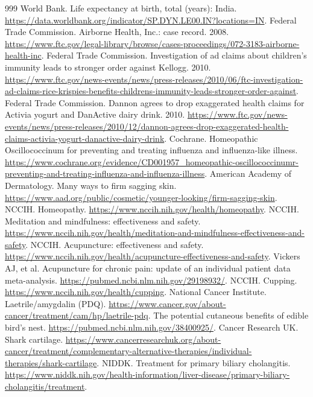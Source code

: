 \documentclass[11pt,oneside]{book}
\begin{document}
\begin{thebibliography}{999}
World Bank. Life expectancy at birth, total (years): India. \url{https://data.worldbank.org/indicator/SP.DYN.LE00.IN?locations=IN}.
Federal Trade Commission. Airborne Health, Inc.: case record. 2008. \url{https://www.ftc.gov/legal-library/browse/cases-proceedings/072-3183-airborne-health-inc}.
Federal Trade Commission. Investigation of ad claims about children's immunity leads to stronger order against Kellogg. 2010. \url{https://www.ftc.gov/news-events/news/press-releases/2010/06/ftc-investigation-ad-claims-rice-krispies-benefits-childrens-immunity-leads-stronger-order-against}.
Federal Trade Commission. Dannon agrees to drop exaggerated health claims for Activia yogurt and DanActive dairy drink. 2010. \url{https://www.ftc.gov/news-events/news/press-releases/2010/12/dannon-agrees-drop-exaggerated-health-claims-activia-yogurt-danactive-dairy-drink}.
Cochrane. Homeopathic Oscillococcinum for preventing and treating influenza and influenza-like illness. \url{https://www.cochrane.org/evidence/CD001957_homeopathic-oscillococcinumr-preventing-and-treating-influenza-and-influenza-illness}.
American Academy of Dermatology. Many ways to firm sagging skin. \url{https://www.aad.org/public/cosmetic/younger-looking/firm-sagging-skin}.
NCCIH. Homeopathy. \url{https://www.nccih.nih.gov/health/homeopathy}.
NCCIH. Meditation and mindfulness: effectiveness and safety. \url{https://www.nccih.nih.gov/health/meditation-and-mindfulness-effectiveness-and-safety}.
NCCIH. Acupuncture: effectiveness and safety. \url{https://www.nccih.nih.gov/health/acupuncture-effectiveness-and-safety}.
Vickers AJ, et al. Acupuncture for chronic pain: update of an individual patient data meta-analysis. \url{https://pubmed.ncbi.nlm.nih.gov/29198932/}.
NCCIH. Cupping. \url{https://www.nccih.nih.gov/health/cupping}.
National Cancer Institute. Laetrile/amygdalin (PDQ). \url{https://www.cancer.gov/about-cancer/treatment/cam/hp/laetrile-pdq}.
The potential cutaneous benefits of edible bird's nest. \url{https://pubmed.ncbi.nlm.nih.gov/38400925/}.
Cancer Research UK. Shark cartilage. \url{https://www.cancerresearchuk.org/about-cancer/treatment/complementary-alternative-therapies/individual-therapies/shark-cartilage}.
NIDDK. Treatment for primary biliary cholangitis. \url{https://www.niddk.nih.gov/health-information/liver-disease/primary-biliary-cholangitis/treatment}.

\end{thebibliography}
\end{document}
